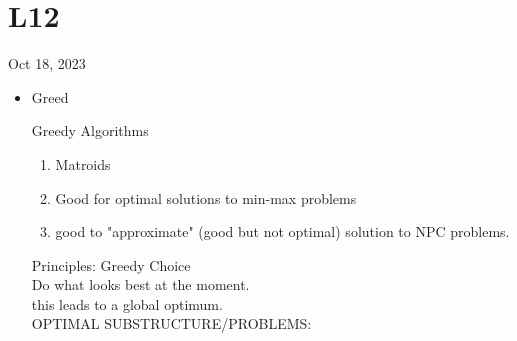 \section{L12}
Oct 18, 2023
\begin{itemize}
	\item Greed
		\begin{theorem}
			Greedy Algorithms
			\begin{enumerate}
				\item Matroids
				\item Good for optimal solutions to min-max problems
				\item good to "approximate" (good but not optimal) solution to NPC problems.
			\end{enumerate}
			Principles: Greedy Choice\\
			Do what looks best at the moment.\\
			this leads to a global optimum.\\
			OPTIMAL SUBSTRUCTURE/PROBLEMS:
			

\end{theorem}
\end{itemize}
